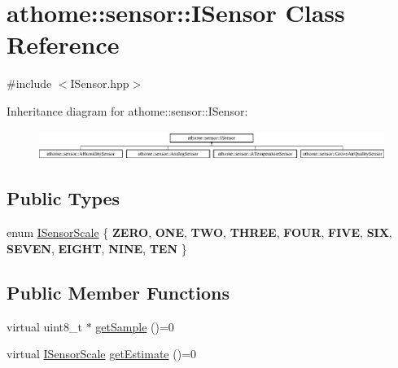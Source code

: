\hypertarget{classathome_1_1sensor_1_1_i_sensor}{}\section{athome\+:\+:sensor\+:\+:I\+Sensor Class Reference}
\label{classathome_1_1sensor_1_1_i_sensor}


{\ttfamily \#include $<$I\+Sensor.\+hpp$>$}

Inheritance diagram for athome\+:\+:sensor\+:\+:I\+Sensor\+:\begin{figure}[H]
\begin{center}
\leavevmode
\includegraphics[height=0.925620cm]{classathome_1_1sensor_1_1_i_sensor}
\end{center}
\end{figure}
\subsection*{Public Types}
\begin{DoxyCompactItemize}
\item 
enum \mbox{\hyperlink{classathome_1_1sensor_1_1_i_sensor_aa70bc27a4c17c86caf96cca776541ddf}{I\+Sensor\+Scale}} \{ \newline
{\bfseries Z\+E\+RO}, 
{\bfseries O\+NE}, 
{\bfseries T\+WO}, 
{\bfseries T\+H\+R\+EE}, 
\newline
{\bfseries F\+O\+UR}, 
{\bfseries F\+I\+VE}, 
{\bfseries S\+IX}, 
{\bfseries S\+E\+V\+EN}, 
\newline
{\bfseries E\+I\+G\+HT}, 
{\bfseries N\+I\+NE}, 
{\bfseries T\+EN}
 \}
\end{DoxyCompactItemize}
\subsection*{Public Member Functions}
\begin{DoxyCompactItemize}
\item 
virtual uint8\+\_\+t $\ast$ \mbox{\hyperlink{classathome_1_1sensor_1_1_i_sensor_a2513fd8acc5d8251439330ca0e78cf04}{get\+Sample}} ()=0
\item 
virtual \mbox{\hyperlink{classathome_1_1sensor_1_1_i_sensor_aa70bc27a4c17c86caf96cca776541ddf}{I\+Sensor\+Scale}} \mbox{\hyperlink{classathome_1_1sensor_1_1_i_sensor_a95785b54ffe3a8f7e48c81b5732e3b9f}{get\+Estimate}} ()=0
\end{DoxyCompactItemize}


